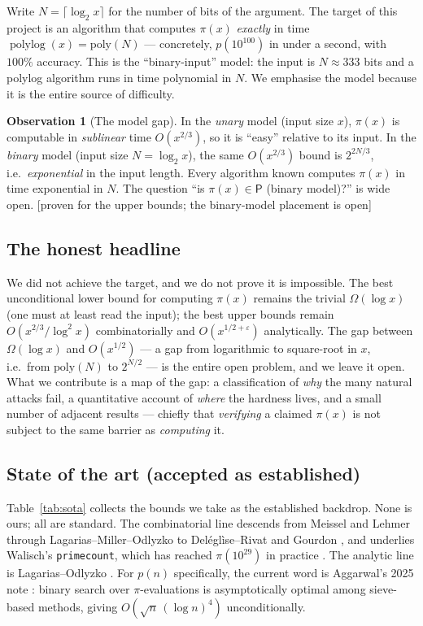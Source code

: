 \documentclass[11pt]{article}
\theoremstyle{plain}
\theoremstyle{definition}
\newtheorem{observation}[theorem]{Observation}
\theoremstyle{remark}
\newcommand{\stat}[1]{\quad\textnormal{\footnotesize\textsf{[\textcolor{accent}{#1}]}}}
\DeclareMathOperator{\polylog}{polylog}
\newcommand{\eps}{\varepsilon}
\begin{document}
Write $N=\lceil \log_2 x\rceil$ for the number of bits of the argument. The
target of this project is an algorithm that computes $\pi(x)$ \emph{exactly} in
time $\polylog(x)=\mathrm{poly}(N)$ --- concretely, $p(10^{100})$ in under a
second, with $100\%$ accuracy. This is the ``binary-input'' model: the input is
$N\approx 333$ bits and a polylog algorithm runs in time polynomial in $N$. We
emphasise the model because it is the entire source of difficulty.

\begin{observation}[The model gap]
\label{obs:model}
In the \emph{unary} model (input size $x$), $\pi(x)$ is computable in
\emph{sublinear} time $O(x^{2/3})$, so it is ``easy'' relative to its input. In
the \emph{binary} model (input size $N=\log_2 x$), the same $O(x^{2/3})$ bound
is $2^{2N/3}$, i.e.\ \emph{exponential} in the input length. Every algorithm
known computes $\pi(x)$ in time exponential in $N$. The question ``is $\pi(x)\in
\mathsf{P}$ (binary model)?'' is wide open.
\stat{proven for the upper bounds; the binary-model placement is open}
\end{observation}

\subsection{The honest headline}

We did not achieve the target, and we do not prove it is impossible. The best
unconditional lower bound for computing $\pi(x)$ remains the trivial
$\Omega(\log x)$ (one must at least read the input); the best upper bounds remain
$O(x^{2/3}/\log^2 x)$ combinatorially and $O(x^{1/2+\eps})$ analytically. The gap
between $\Omega(\log x)$ and $O(x^{1/2})$ --- a gap from logarithmic to
square-root in $x$, i.e.\ from $\mathrm{poly}(N)$ to $2^{N/2}$ --- is the entire
open problem, and we leave it open. What we contribute is a map of the gap: a
classification of \emph{why} the many natural attacks fail, a quantitative
account of \emph{where} the hardness lives, and a small number of adjacent
results --- chiefly that \emph{verifying} a claimed $\pi(x)$ is not subject to the
same barrier as \emph{computing} it.

\subsection{State of the art (accepted as established)}

Table~\ref{tab:sota} collects the bounds we take as the established backdrop.
None is ours; all are standard. The combinatorial line descends from
Meissel and Lehmer through Lagarias--Miller--Odlyzko \cite{lmo1985} to
Del\'egl\`ise--Rivat \cite{delegliserivat1996} and Gourdon \cite{gourdon2001},
and underlies Walisch's \texttt{primecount}, which has reached $\pi(10^{29})$ in
practice \cite{walisch}. The analytic line is Lagarias--Odlyzko
\cite{lagariasodlyzko1987}. For $p(n)$ specifically, the current word is
Aggarwal's 2025 note \cite{aggarwal2025}: binary search over $\pi$-evaluations is
asymptotically optimal among sieve-based methods, giving
$O(\sqrt{n}\,(\log n)^4)$ unconditionally.
\end{document}
